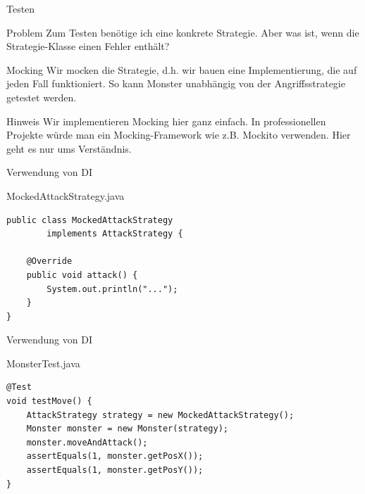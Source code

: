 \begin{frame}{Testen}
	\begin{alertblock}{Problem}
		Zum Testen benötige ich eine konkrete Strategie. Aber was ist,
		wenn die Strategie-Klasse einen Fehler enthält?
	\end{alertblock}
	\pause
	\begin{exampleblock}{Mocking}
		Wir mocken die Strategie, d.h. wir bauen eine Implementierung, die 
		auf jeden Fall funktioniert. So kann Monster unabhängig von der 
		Angriffsstrategie getestet werden.
	\end{exampleblock}
	\pause
	\begin{block}{Hinweis}
		Wir implementieren Mocking hier ganz einfach. In professionellen
		Projekte würde man ein Mocking-Framework wie z.B. Mockito verwenden.
		Hier geht es nur ums Verständnis.
	\end{block}
\end{frame}

\begin{frame}[fragile]{Verwendung von DI}
	\begin{exampleblock}{MockedAttackStrategy.java}
		\begin{lstlisting}
public class MockedAttackStrategy 
		implements AttackStrategy {

	@Override
	public void attack() {
		System.out.println("...");
	}
}
		\end{lstlisting}
	\end{exampleblock}
\end{frame}

\begin{frame}[fragile]{Verwendung von DI}
	\begin{exampleblock}{MonsterTest.java}
		\begin{lstlisting}
@Test
void testMove() {
	AttackStrategy strategy = new MockedAttackStrategy();
	Monster monster = new Monster(strategy);
	monster.moveAndAttack();
	assertEquals(1, monster.getPosX());
	assertEquals(1, monster.getPosY());
}
		\end{lstlisting}
	\end{exampleblock}
\end{frame}

